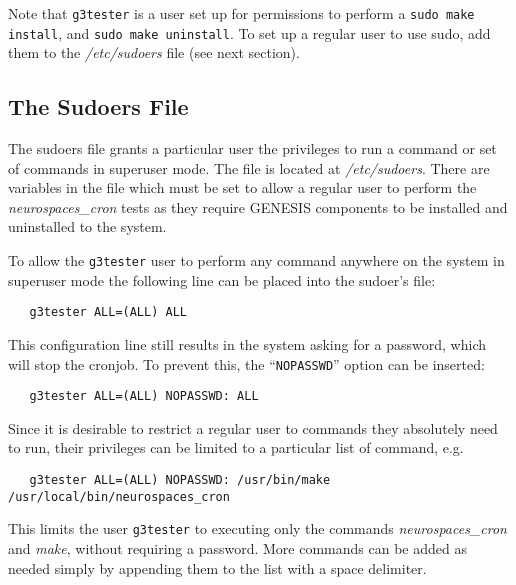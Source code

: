 \documentclass[12pt]{article}
\begin{document}
Note that {\tt g3tester} is a user set up for permissions to perform a {\tt sudo make install}, and {\tt sudo make uninstall}. To set up a regular user to use sudo, add them to the {\it /etc/sudoers} file (see next section).

\subsection*{The Sudoers File}

The sudoers file grants a particular user the privileges to run a command or set of commands in superuser mode. The file is located at {\it /etc/sudoers}. There are variables in the file which must be set to allow a regular user to perform the {\it neurospaces\_cron} tests as they require GENESIS components to be installed and uninstalled to the system.

To allow the {\tt g3tester} user to perform any command anywhere on the system in superuser mode the following line can be placed into the sudoer's file:
\begin{verbatim}
   g3tester ALL=(ALL) ALL
\end{verbatim}
This configuration line still results in the system asking for a password, which will stop the cronjob. To prevent this, the ``{\tt NOPASSWD}'' option can be inserted:
\begin{verbatim}
   g3tester ALL=(ALL) NOPASSWD: ALL
\end{verbatim}
Since it is desirable to restrict a regular user to commands they absolutely need to run, their privileges can be limited to a particular list of command, e.g.
\begin{verbatim}
   g3tester ALL=(ALL) NOPASSWD: /usr/bin/make /usr/local/bin/neurospaces_cron
\end{verbatim}
This limits the user {\tt g3tester} to executing only the commands {\it neurospaces\_cron} and {\it make}, without requiring a password. More commands can be added as needed simply by appending them to the list with a space delimiter. 
\end{document}
